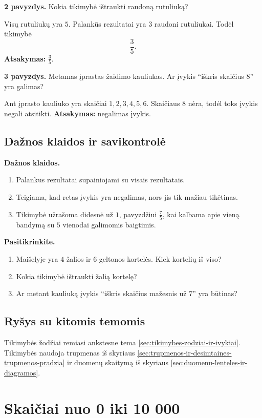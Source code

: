 \textbf{2 pavyzdys.} Kokia tikimybė ištraukti raudoną rutuliuką?

Visų rutuliukų yra \(5\). Palankūs rezultatai yra \(3\) raudoni rutuliukai. Todėl tikimybė
\[
\frac{3}{5}.
\]
\textbf{Atsakymas:} \(\frac{3}{5}\).

\textbf{3 pavyzdys.} Metamas įprastas žaidimo kauliukas. Ar įvykis ``iškris skaičius \(8\)'' yra galimas?

Ant įprasto kauliuko yra skaičiai \(1,2,3,4,5,6\). Skaičiaus \(8\) nėra, todėl toks įvykis negali atsitikti.
\textbf{Atsakymas:} negalimas įvykis.

\subsection{Dažnos klaidos ir savikontrolė}

\textbf{Dažnos klaidos.}
\begin{enumerate}[label=\arabic*.]
\item Palankūs rezultatai supainiojami su visais rezultatais.
\item Teigiama, kad retas įvykis yra negalimas, nors jis tik mažiau tikėtinas.
\item Tikimybė užrašoma didesnė už \(1\), pavyzdžiui \(\frac{7}{5}\), kai kalbama apie vieną bandymą su \(5\) vienodai galimomis baigtimis.
\end{enumerate}

\textbf{Pasitikrinkite.}
\begin{enumerate}[label=\arabic*.]
\item Maišelyje yra \(4\) žalios ir \(6\) geltonos kortelės. Kiek kortelių iš viso?
\item Kokia tikimybė ištraukti žalią kortelę?
\item Ar metant kauliuką įvykis ``iškris skaičius mažesnis už \(7\)'' yra būtinas?
\end{enumerate}

\subsection{Ryšys su kitomis temomis}

Tikimybės žodžiai remiasi ankstesne tema \ref{sec:tikimybes-zodziai-ir-ivykiai}. Tikimybės naudoja trupmenas iš skyriaus \ref{sec:trupmenos-ir-desimtaines-trupmenos-pradzia} ir duomenų skaitymą iš skyriaus \ref{sec:duomenu-lenteles-ir-diagramos}.

\section{Skaičiai nuo 0 iki 10 000}\label{sec:skaiciai-nuo-0-iki-10000}

